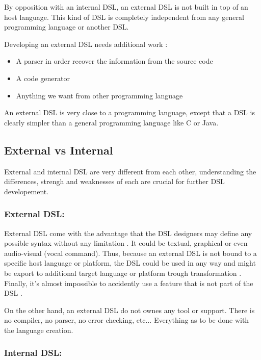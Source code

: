 By opposition with an internal \gls{DSL}, an external \gls{DSL} is not built in
top of an host language. This kind of \gls{DSL} is completely independent from
any general programming language or another \gls{DSL}.

Developing an external \gls{DSL} needs additional work :
\begin{itemize}
\item A parser in order recover the information from the source code
\item A code generator
\item Anything we want from other programming language
\end{itemize}

An external \gls{DSL} is very close to a programming language, except that a
\gls{DSL} is clearly simpler than a general programming language like C or Java.

\subsection{External vs Internal}
\label{sec:external_vs_internal}

External and internal \gls{DSL} are very different from each other,
understanding the differences, strengh and weaknesses of each are crucial for
further \gls{DSL} developement.

\subsubsection{External \gls{DSL}:}

External \gls{DSL} come with the advantage that the \gls{DSL} designers may
define any possible syntax without any limitation \cite{strembeckmarkzdunuwe2009}. It could be textual,
graphical or even audio-visual (vocal command). Thus, because an external
\gls{DSL} is not bound to a specific host language or platform, the \gls{DSL}
could be used in any way and might be export to additional target language or
platform trough transformation \cite{strembeckmarkzdunuwe2009}. Finally, it's
almost impossible to accidently use a feature that is not part of the \gls{DSL}
\cite{strembeckmarkzdunuwe2009}.

On the other hand, an external \gls{DSL} do not ownes any tool or support. There
is no compiler, no parser, no error checking, etc... Everything as to be done
with the language creation.

\subsubsection{Internal \gls{DSL}:}

